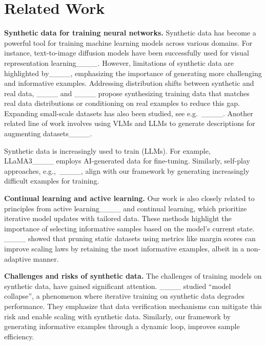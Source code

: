 \section{Related Work}
\textbf{Synthetic data for training neural networks.} Synthetic data has become a powerful tool for training machine learning models across various domains. For instance, text-to-image diffusion models have been successfully used for visual representation learning____. However,  limitations of synthetic data are highlighted by____, emphasizing the importance of generating more challenging and informative examples. Addressing distribution shifts between synthetic and real data, ____ and ____ propose synthesizing training data that matches real data distributions or conditioning on real examples to reduce this gap. Expanding small-scale datasets has also been studied, see e.g.\ ____.
Another related line of work involves using VLMs and LLMs to generate descriptions for augmenting datasets____.

Synthetic data is increasingly used to train (LLMs). For example, LLaMA3____ employs AI-generated data for fine-tuning. Similarly, self-play approaches, e.g.,\ ____, align with our framework by generating increasingly difficult examples for training.

\textbf{Continual learning and active learning.}
 Our work is also closely related to principles from active learning____ and continual learning, which prioritize iterative model updates with tailored data. These methods highlight the importance of selecting informative samples based on the model's current state.
 ____ showed that pruning static datasets using metrics like margin scores can improve scaling laws by retaining the most informative examples, albeit in a non-adaptive manner.
 
\textbf{Challenges and risks of synthetic data.}
The challenges of training models on synthetic data, have gained significant attention. ____ studied “model collapse”, a phenomenon where iterative training on synthetic data degrades performance. 
They emphasize that data verification mechanisms can mitigate this risk and enable scaling with synthetic data. Similarly, our framework by generating informative examples through a dynamic loop, improves sample efficiency.